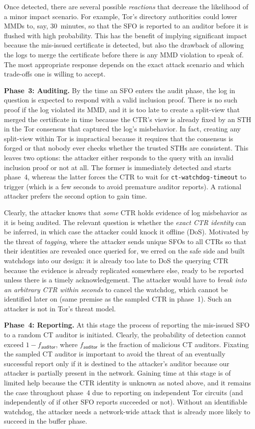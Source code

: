 Once detected, there are several possible \emph{reactions} that decrease the
likelihood of a minor impact scenario.  For example, Tor's directory
authorities could lower MMDs to, say, 30~minutes, so that the SFO is reported to
an auditor before it is flushed with high probability.  This has the benefit of
implying significant impact because the mis-issued certificate is detected, but
also the drawback of allowing the logs to merge the certificate before there is
any MMD violation to speak of.  The most appropriate response depends on the
exact attack scenario and which trade-offs one is willing to accept.

\textbf{Phase~3: Auditing.}
By the time an SFO enters the audit phase, the log in question is expected to
respond with a valid inclusion proof.  There is no such proof if the log
violated its MMD, and it is too late to create a split-view that merged the
certificate in time because the CTR's view is already fixed by an STH in the
Tor consensus that captured the log's misbehavior.  In fact, creating any
split-view within Tor is impractical because it requires that the consensus is
forged or that nobody ever checks whether the trusted STHs are consistent.
This leaves two options:
	the attacker either responds to the query with an invalid inclusion proof or
	not at all.
The former is immediately detected and starts phase~4, whereas the latter forces
the CTR to wait for \texttt{ct-watchdog-timeout} to trigger (which is a
few seconds to avoid premature auditor reports).  A rational attacker prefers
the second option to gain time.

Clearly, the attacker knows that \emph{some} CTR holds evidence of log
misbehavior as it is being audited.  The relevant question is whether the
\emph{exact CTR identity} can be inferred, in which case the attacker could
knock it offline (DoS).  Motivated by the threat of \emph{tagging}, where the
attacker sends unique SFOs to all CTRs so that their identities are revealed
once queried for, we erred on the safe side and built watchdogs into our design:
it is already too late to DoS the querying CTR because the evidence is already
replicated somewhere else, ready to be reported unless there is a timely
acknowledgement. The attacker would have to \emph{break into an arbitrary CTR
within seconds} to cancel the watchdog, which cannot be identified later on
(same premise as the sampled CTR in phase~1).  Such an attacker is not in Tor's
threat model.

\textbf{Phase~4: Reporting.}
At this stage the process of reporting the mis-issued SFO to a random CT auditor
is initiated.  Clearly, the probability of detection cannot exceed
$1-f_{\mathsf{auditor}}$, where $f_{\mathsf{auditor}}$ is the fraction of
malicious CT auditors.  Fixating the sampled CT auditor is important to avoid
the threat of an eventually successful report only if it is destined to the
attacker's auditor because our attacker is partially present in the network.
Gaining time at this stage is of limited help because the CTR identity is
unknown as noted above, and it remains the
case throughout phase~4 due to reporting on independent Tor circuits (and
independently of if other SFO reports succeeded or not).  Without an
identifiable watchdog, the attacker needs a network-wide attack that is already
more likely to succeed in the buffer phase.
